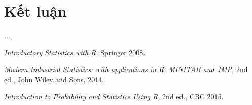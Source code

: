 \documentclass[a4paper]{article}
\begin{document}
\section{Kết luận}
	...


\begin{thebibliography}{99999}
 {\em Introductory Statistics with R.}  Springer 2008.

{\em Modern Industrial Statistics: with applications in R, MINITAB and JMP,} 2nd ed.,  John Wiley and Sons, 2014.

{\em Introduction to Probability and Statistics Using R,} 2nd ed., CRC 2015.

\end{thebibliography}
\end{document}
